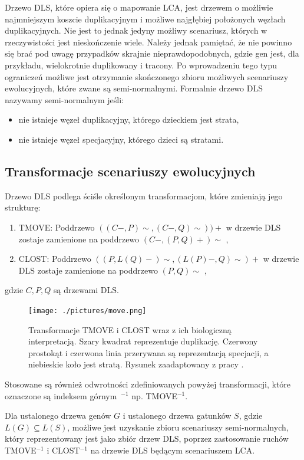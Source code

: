 \documentclass[licencjacka]{pracamgr}
\begin{document}
Drzewo DLS, które opiera się o mapowanie LCA, jest drzewem o możliwie najmniejszym koszcie duplikacyjnym i możliwe najgłębiej położonych węzłach duplikacyjnych. Nie jest to jednak jedyny możliwy scenariusz, których w rzeczywistości jest nieskończenie wiele. Należy jednak pamiętać, że nie powinno się brać pod uwagę przypadków skrajnie nieprawdopodobnych, gdzie gen jest, dla przykładu, wielokrotnie duplikowany i tracony. Po wprowadzeniu tego typu ograniczeń możliwe jest otrzymanie skończonego zbioru możliwych scenariuszy ewolucyjnych, które zwane są semi-normalnymi. Formalnie drzewo DLS nazywamy semi-normalnym jeśli:
\begin{itemize}
\item nie istnieje węzeł duplikacyjny, którego dzieckiem jest strata,
\item nie istnieje węzeł specjacyjny, którego dzieci są stratami.
\end{itemize}


\subsection{Transformacje scenariuszy ewolucyjnych}

Drzewo DLS podlega ściśle określonym transformacjom, które zmieniają jego strukturę: 
\begin{enumerate}
\item TMOVE: Poddrzewo $((C-,P)\sim,(C-,Q)\sim))+$ w drzewie DLS zostaje zamienione na poddrzewo $(C-,(P,Q)+)\sim $ ,
\item CLOST: Poddrzewo $((P,L(Q)-)\sim,(L(P)-,Q)\sim)+$ w drzewie DLS zostaje zamienione na poddrzewo $(P,Q)\sim $ ,
\end{enumerate}
gdzie $C,P,Q$ są drzewami DLS.

\begin{figure}[H]
  \centering
  \texttt{[image: ./pictures/move.png]}
  \caption{Transformacje TMOVE i CLOST wraz z ich biologiczną interpretacją. Szary  kwadrat reprezentuje duplikację. Czerwony prostokąt i czerwona linia przerywana są reprezentacją specjacji, a niebieskie koło jest stratą. Rysunek zaadaptowany z pracy \cite{Gorecki2006dls}.}
\end{figure}



Stosowane są również odwrotności zdefiniowanych powyżej transformacji, które oznaczone są indeksem górnym~$^{-1}$ np. TMOVE$^{-1}$.

Dla ustalonego drzewa genów $G$ i ustalonego drzewa gatunków $S$, gdzie $L(G) \subseteq L(S)$, możliwe jest uzyskanie zbioru scenariuszy semi-normalnych, który reprezentowany jest jako zbiór drzew DLS, poprzez zastosowanie ruchów TMOVE$^{-1}$ i CLOST$^{-1}$ na drzewie DLS będącym scenariuszem LCA. 
\end{document}
